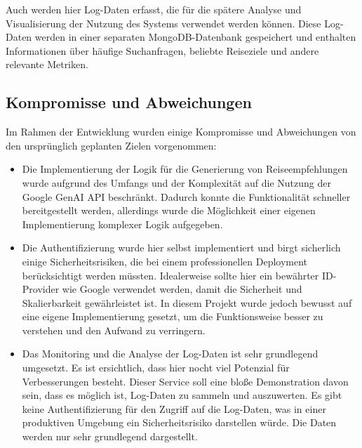 Auch werden hier Log-Daten erfasst, die für die spätere Analyse und Visualisierung der Nutzung des Systems verwendet werden können. Diese Log-Daten werden in einer separaten MongoDB-Datenbank gespeichert und enthalten Informationen über häufige Suchanfragen, beliebte Reiseziele und andere relevante Metriken.

\subsection{Kompromisse und Abweichungen}

Im Rahmen der Entwicklung wurden einige Kompromisse und Abweichungen von den ursprünglich geplanten Zielen vorgenommen:

\begin{itemize}
  \item Die Implementierung der Logik für die Generierung von Reiseempfehlungen wurde aufgrund des Umfangs und der Komplexität auf die Nutzung der Google GenAI API beschränkt. Dadurch konnte die Funktionalität schneller bereitgestellt werden, allerdings wurde die Möglichkeit einer eigenen Implementierung komplexer Logik aufgegeben.
  \item Die Authentifizierung wurde hier selbst implementiert und birgt sicherlich einige Sicherheitsrisiken, die bei einem professionellen Deployment berücksichtigt werden müssten. Idealerweise sollte hier ein bewährter ID-Provider wie Google verwendet werden, damit die Sicherheit und Skalierbarkeit gewährleistet ist. In diesem Projekt wurde jedoch bewusst auf eine eigene Implementierung gesetzt, um die Funktionsweise besser zu verstehen und den Aufwand zu verringern.
  \item Das Monitoring und die Analyse der Log-Daten ist sehr grundlegend umgesetzt. Es ist ersichtlich, dass hier nocht viel Potenzial für Verbesserungen besteht. Dieser Service soll eine bloße Demonstration davon sein, dass es möglich ist, Log-Daten zu sammeln und auszuwerten. Es gibt keine Authentifizierung für den Zugriff auf die Log-Daten, was in einer produktiven Umgebung ein Sicherheitsrisiko darstellen würde. Die Daten werden nur sehr grundlegend dargestellt. 
\end{itemize}
